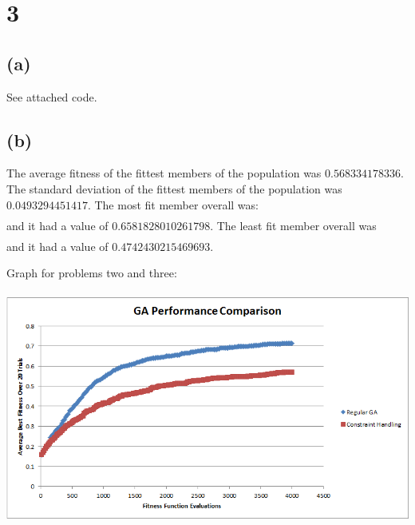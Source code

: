 \documentclass[12pt]{article}
\begin{document}
\section{3}
\subsection{(a)}
See attached code.

\subsection{(b)}
The average fitness of the fittest members of the population was $0.568334178336$.  The standard deviation of the fittest members of the population was $0.0493294451417$.  The most fit member overall was:
\begin{align*} 
[3.2192452719665274, 3.1752263810653747, 3.3391066790724357, 3.0699177077612285,\\ 3.2767720905604634, 0.44277532656624796, 3.040299782122242, 3.2914751565371816,\\ 3.3073830752841777, 2.8941620504517847, 2.20417127826211, 0.25248928510518076,\\ 0.4174249174304465, 0.5029422220182223, 0.05775107009324282, 0.30699893367216624,\\ 0.4748142394786834, 0.36139033193565867, 0.36031050287714694, 0.7728398171231345]
\end{align*}
and it had a value of $0.6581828010261798$.  The least fit member overall was
\begin{align*}
[2.403178454838199, 0.33434678016001496, 3.111555871678033, 3.332531462978563,\\ 4.656845412954224, 3.41922063881561, 2.99654482242923, 0.3360796847780704,\\ 0.9428552414215912, 3.3022903545666082, 0.5311193521156884, 0.19765493674257806,\\ 2.4414923972041658, 0.2738397544478779, 0.08654813985261467, 2.7958082492484344,\\ 0.3913211802708072, 0.8773211370251517, 0.22628537805110427, 2.1291493186450428]
\end{align*}
and it had a value of $0.4742430215469693$.

\pagebreak
Graph for problems two and three:\\\\
\includegraphics{ga_performance_graph.png}
\end{document}
